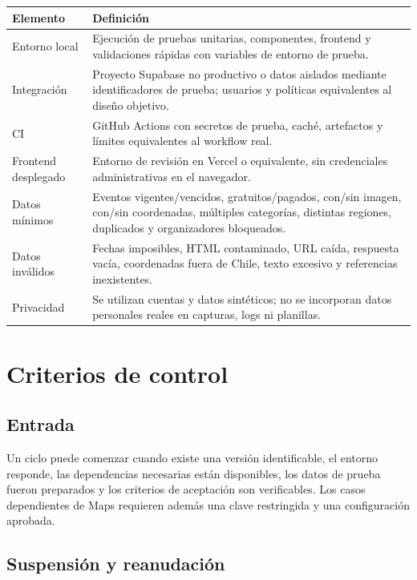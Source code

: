 \documentclass[11pt,a4paper]{article}
\begin{document}
\begin{longtable}{@{}L{3.5cm}L{11.3cm}@{}}
\toprule
\textbf{Elemento} & \textbf{Definición} \\
\midrule
\endhead
Entorno local & Ejecución de pruebas unitarias, componentes, frontend y validaciones rápidas con variables de entorno de prueba. \\
Integración & Proyecto Supabase no productivo o datos aislados mediante identificadores de prueba; usuarios y políticas equivalentes al diseño objetivo. \\
CI & GitHub Actions con secretos de prueba, caché, artefactos y límites equivalentes al workflow real. \\
Frontend desplegado & Entorno de revisión en Vercel o equivalente, sin credenciales administrativas en el navegador. \\
Datos mínimos & Eventos vigentes/vencidos, gratuitos/pagados, con/sin imagen, con/sin coordenadas, múltiples categorías, distintas regiones, duplicados y organizadores bloqueados. \\
Datos inválidos & Fechas imposibles, HTML contaminado, URL caída, respuesta vacía, coordenadas fuera de Chile, texto excesivo y referencias inexistentes. \\
Privacidad & Se utilizan cuentas y datos sintéticos; no se incorporan datos personales reales en capturas, logs ni planillas. \\
\bottomrule
\end{longtable}

\section{Criterios de control}

\subsection{Entrada}

Un ciclo puede comenzar cuando existe una versión identificable, el entorno responde,
las dependencias necesarias están disponibles, los datos de prueba fueron preparados y
los criterios de aceptación son verificables. Los casos dependientes de Maps requieren
además una clave restringida y una configuración aprobada.

\subsection{Suspensión y reanudación}
\end{document}
